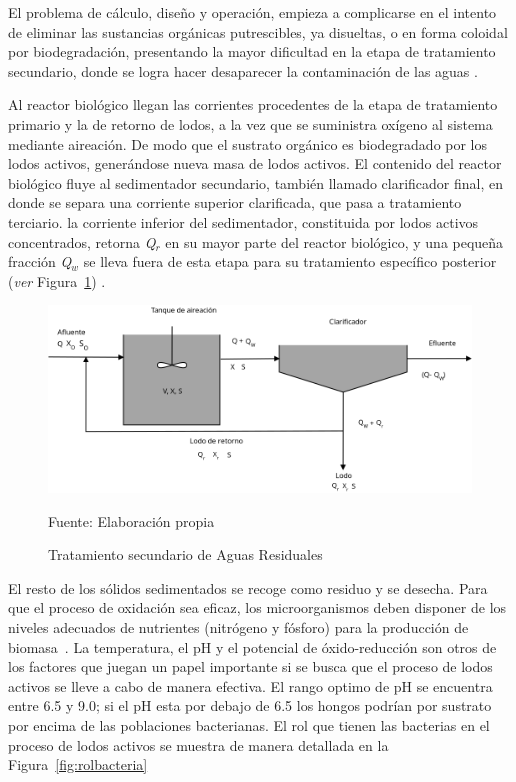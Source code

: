 El problema de cálculo, diseño y operación, empieza a complicarse en el intento de eliminar las sustancias orgánicas putrescibles, ya disueltas, o en forma coloidal por biodegradación, presentando la mayor dificultad en la etapa de tratamiento secundario, donde se logra hacer desaparecer la contaminación de las aguas \citep{delapena13}.\par
Al reactor biológico llegan las corrientes procedentes de la etapa de tratamiento primario y la de retorno de lodos, a la vez que se suministra oxígeno al sistema mediante aireación. De modo que el sustrato orgánico es biodegradado por los lodos activos, generándose nueva masa de lodos activos. El contenido del reactor biológico fluye al sedimentador secundario, también llamado clarificador final, en donde se separa una corriente superior clarificada, que pasa a tratamiento terciario. la corriente inferior del sedimentador, constituida por lodos activos concentrados, retorna \emph{Q$_{r}$} en su mayor parte del reactor biológico, y una pequeña fracción \emph{Q$_{w}$} se lleva fuera de esta etapa para su tratamiento específico posterior (\emph{ver} Figura~\ref{fig:balance}) \citep{manuel13}.\par
	\begin{figure}[!h]
		\centering
		\includegraphics[scale=0.35]{Diagrama_de_flujo.png}
		\caption{Tratamiento secundario de Aguas Residuales}
		\small{Fuente: Elaboración propia}
		\label{fig:balance}
	\end{figure}
El resto de los sólidos sedimentados se recoge como residuo y se desecha. Para que el proceso de oxidación sea eficaz, los microorganismos deben disponer de los niveles adecuados de nutrientes (nitrógeno y fósforo) para la producción de biomasa~\citep{ashok16}.
La temperatura, el pH y el potencial de óxido-reducción son otros de los factores que juegan un papel importante si se busca que el proceso de lodos activos se lleve a cabo de manera efectiva. El rango optimo de pH se encuentra entre 6.5 y 9.0; si el pH esta por debajo de 6.5 los hongos podrían por sustrato por encima de las poblaciones bacterianas. El rol que tienen las bacterias en el proceso de lodos activos se muestra de manera detallada en la Figura~\ref{fig:rolbacteria}~\citep{ashok16, winkler96}
